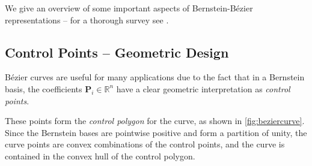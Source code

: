 \documentclass[final,3p,mathptmx]{elsarticle}
\begin{document}
We give an overview of some important aspects of Bernstein-B\'{e}zier representations -- for a thorough survey see \cite{farouki2012bernstein}.
\subsection{Control Points -- Geometric Design}\label{sec:motivation:bezier}
B\'{e}zier curves are useful for many applications due to the fact that in a Bernstein basis, the coefficients $\mathbf{P}_{i} \in \mathbb{R}^{n}$ have a clear geometric interpretation as \emph{control points}. 

These points form the \emph{control polygon} for the curve, as shown in \autoref{fig:beziercurve}. Since the Bernstein bases are pointwise positive and form a partition of unity, the curve points are convex combinations of the control points, and the curve is contained in the convex hull of the control polygon.
\end{document}
